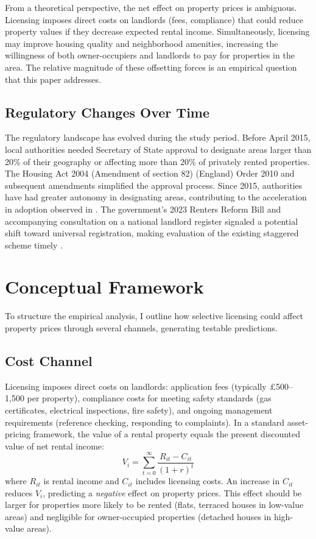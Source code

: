 \documentclass[12pt]{article}
\begin{document}
From a theoretical perspective, the net effect on property prices is ambiguous. Licensing imposes direct costs on landlords (fees, compliance) that could reduce property values if they decrease expected rental income. Simultaneously, licensing may improve housing quality and neighborhood amenities, increasing the willingness of both owner-occupiers and landlords to pay for properties in the area. The relative magnitude of these offsetting forces is an empirical question that this paper addresses.

\subsection{Regulatory Changes Over Time}

The regulatory landscape has evolved during the study period. Before April 2015, local authorities needed Secretary of State approval to designate areas larger than 20\% of their geography or affecting more than 20\% of privately rented properties. The Housing Act 2004 (Amendment of section 82) (England) Order 2010 and subsequent amendments simplified the approval process. Since 2015, authorities have had greater autonomy in designating areas, contributing to the acceleration in adoption observed in . The government's 2023 Renters Reform Bill and accompanying consultation on a national landlord register signaled a potential shift toward universal registration, making evaluation of the existing staggered scheme timely \citep{mhclg2023consultation}.


\section{Conceptual Framework}
\label{sec:framework}

To structure the empirical analysis, I outline how selective licensing could affect property prices through several channels, generating testable predictions.

\subsection{Cost Channel}

Licensing imposes direct costs on landlords: application fees (typically \pounds 500--1,500 per property), compliance costs for meeting safety standards (gas certificates, electrical inspections, fire safety), and ongoing management requirements (reference checking, responding to complaints). In a standard asset-pricing framework, the value of a rental property equals the present discounted value of net rental income:
\begin{equation}
V_i = \sum_{t=0}^{\infty} \frac{R_{it} - C_{it}}{(1 + r)^t}
\end{equation}
where $R_{it}$ is rental income and $C_{it}$ includes licensing costs. An increase in $C_{it}$ reduces $V_i$, predicting a \emph{negative} effect on property prices. This effect should be larger for properties more likely to be rented (flats, terraced houses in low-value areas) and negligible for owner-occupied properties (detached houses in high-value areas).
\end{document}
